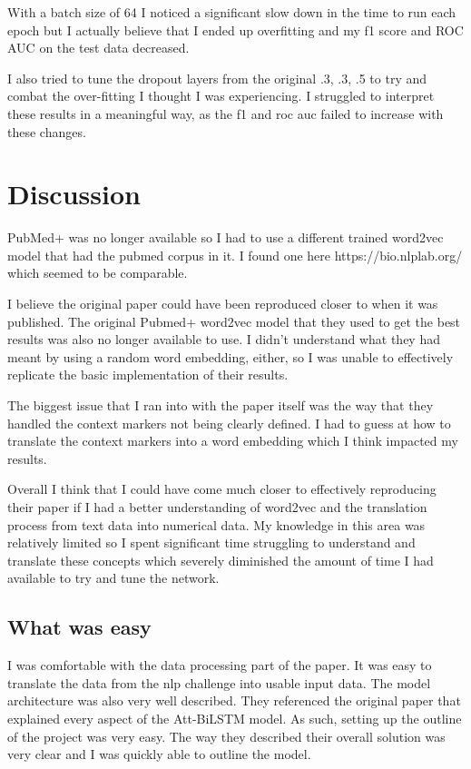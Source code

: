 \documentclass[11pt,a4paper]{article}
\begin{document}
With a batch size of 64 I noticed a significant slow down in the time to run each epoch but I actually believe that I ended up overfitting and my f1 score and ROC AUC on the test data decreased.

I also tried to tune the dropout layers from the original .3, .3, .5 to try and combat the over-fitting I thought I was experiencing. I struggled to interpret these results in a meaningful way, as the f1 and roc auc failed to increase with these changes.

\section{Discussion}

PubMed+ was no longer available so I had to use a different trained word2vec model that had the pubmed corpus in it. I found one here https://bio.nlplab.org/ which seemed to be comparable.

I believe the original paper could have been reproduced closer to when it was published. The original Pubmed+ word2vec model that they used to get the best results was also no longer available to use. I didn't understand what they had meant by using a random word embedding, either, so I was unable to effectively replicate the basic implementation of their results.

The biggest issue that I ran into with the paper itself was the way that they handled the context markers not being clearly defined. I had to guess at how to translate the context markers into a word embedding which I think impacted my results. 

Overall I think that I could have come much closer to effectively reproducing their paper if I had a better understanding of word2vec and the translation process from text data into numerical data. My knowledge in this area was relatively limited so I spent significant time struggling to understand and translate these concepts which severely diminished the amount of time I had available to try and tune the network.

\subsection{What was easy}
I was comfortable with the data processing part of the paper. It was easy to translate the data from the nlp challenge into usable input data. The model architecture was also very well described. They referenced the original paper that explained every aspect of the Att-BiLSTM model. As such, setting up the outline of the project was very easy. The way they described their overall solution was very clear and I was quickly able to outline the model.
\end{document}
